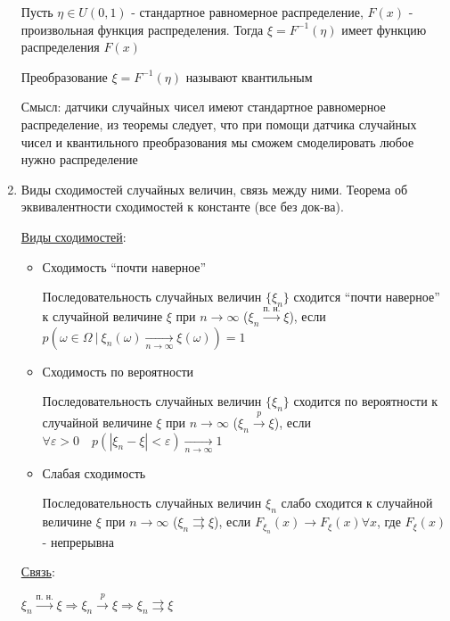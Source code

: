 \documentclass[12pt]{article}
\begin{document}
\begin{enumerate}
    Пусть $\eta \in U(0, 1)$ - стандартное равномерное распределение, $F(x)$ - произвольная функция распределения. 
    Тогда $\xi = F^{-1}(\eta)$ имеет функцию распределения $F(x)$

    Преобразование $\xi = F^{-1}(\eta)$ называют квантильным

    Смысл: датчики случайных чисел имеют стандартное равномерное распределение, из теоремы следует, что при помощи
    датчика случайных чисел и квантильного преобразования мы сможем смоделировать любое нужно распределение


    \item Виды сходимостей случайных величин, связь между ними. Теорема об эквивалентности сходимостей к константе (все без док-ва).

    \hyperlink{convergencetypes}{Виды сходимостей}:

    \begin{itemize}
        \item Сходимость \enquote{почти наверное}

        \Defs Последовательность случайных величин $\{\xi_n\}$ сходится \enquote{почти наверное} к случайной величине $\xi$ при $n \to \infty$ ($\xi_n \overset{\text{п. н.}}{\longrightarrow} \xi$), 
        если $p(\omega \in \Omega \ | \ \xi_n(\omega) \underset{n \to \infty}{\longrightarrow} \xi(\omega)) = 1$

        \item Сходимость по вероятности

        \Defs Последовательность случайных величин $\{\xi_n\}$ сходится по вероятности к случайной величине $\xi$ при $n \to \infty$
        ($\xi_n \overset{p}{\longrightarrow} \xi$), если $\forall \varepsilon > 0 \quad p(|\xi_n - \xi| < \varepsilon) \underset{n \to \infty}{\longrightarrow} 1$
        
        \item Слабая сходимость

        \Defs Последовательность случайных величин $\xi_n$ слабо сходится к случайной величине $\xi$ при $n \to \infty$
        ($\xi_n \rightrightarrows \xi$), если $F_{\xi_n}(x) \longrightarrow F_\xi(x) \forall x$, где $F_\xi(x)$ - непрерывна
    \end{itemize}

    \hyperlink{connectionbetweenconvergencetypes}{Связь}: 

    \Ths $\xi_n \overset{\text{п. н.}}{\longrightarrow} \xi \Longrightarrow \xi_n \overset{p}{\longrightarrow} \xi \Longrightarrow \xi_n \rightrightarrows \xi$


\end{enumerate}
\end{document}
